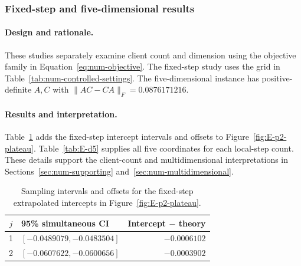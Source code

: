 \subsubsection{Fixed-step and five-dimensional results}
\label{app:num-supporting-results}

\paragraph{Design and rationale.}
These studies separately examine client count and dimension using the
objective family in Equation~\eqref{eq:num-objective}. The fixed-step
study uses the grid in Table~\ref{tab:num-controlled-settings}.
The five-dimensional instance has positive-definite $A,C$ with
$\|AC-CA\|_F=0.0876171216$.

\paragraph{Results and interpretation.}
Table~\ref{tab:E-plateau} adds the fixed-step intercept intervals and
offsets to Figure~\ref{fig:E-p2-plateau}. Table~\ref{tab:E-d5} supplies
all five coordinates for each local-step count. These details support
the client-count and multidimensional interpretations in
Sections~\ref{sec:num-supporting} and~\ref{sec:num-multidimensional}.

\begin{table}[tbp]
\centering\small
\caption{Sampling intervals and offsets for the fixed-step extrapolated
intercepts in Figure~\ref{fig:E-p2-plateau}.}
\label{tab:E-plateau}
\begin{tabular}{@{}clr@{}}
\toprule
$j$ & 95\% simultaneous CI & Intercept $-$ theory \\
\midrule
1 & $[-0.0489079,-0.0483504]$ & $-0.0006102$ \\
2 & $[-0.0607622,-0.0600656]$ & $-0.0003902$ \\
\bottomrule
\end{tabular}
\end{table}

